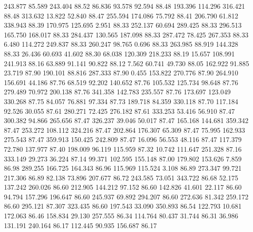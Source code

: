  243.877   85.589  243.404        88.52
  86.836   93.578   92.594        88.48
 193.396  114.296  316.421        88.48
 313.632   13.822   52.840        88.47
 255.594  174.086   75.792        88.41
 206.790   61.812  338.943        88.39
 170.975  125.695    2.951        88.33
 252.137   60.694  289.425        88.33
 296.513  165.750  168.017        88.33
 284.437  130.565  187.098        88.33
 287.472   78.425  267.353        88.33
   6.480  114.272  249.837        88.33
 260.247   98.765    0.696        88.33
 263.985   88.919  144.328        88.33
  26.436   60.693   41.602        88.30
  68.038  120.309  218.233        88.19
  15.657  108.991  241.913        88.16
  63.889   91.141   90.822        88.12
   7.562   60.741   49.730        88.05
 162.922   91.885   23.719        87.90
 190.101   88.816  287.333        87.90
   0.455  153.822  270.776        87.90
 264.910  156.691   44.186        87.76
  68.519   92.202  140.652        87.76
 105.532  125.734   98.648        87.76
 279.489   70.972  200.138        87.76
 341.358  142.783  235.557        87.76
 173.697  123.049  330.268        87.75
  84.057   76.881   97.334        87.73
 189.718   84.359  330.118        87.70
 117.184   92.526   30.055        87.61
 280.271   72.425  276.182        87.61
 333.253   53.416   56.910        87.47
 300.382   94.866  265.656        87.47
 326.237   39.046   50.017        87.47
 165.168  144.681  359.342        87.47
 253.272  108.112  324.216        87.47
 202.864  176.307   65.309        87.47
  75.995  162.933  275.543        87.47
 359.913  150.425  242.809        87.47
  16.096   56.553   48.116        87.47
 117.379   72.780  137.977        87.40
 198.009   96.119  115.959        87.32
  10.742  111.647  251.328        87.16
 333.149   29.273   36.224        87.14
  99.371  102.595  155.148        87.00
 179.802  153.626    7.859        86.98
 289.255  166.725  164.343        86.96
 115.969  115.524    3.108        86.89
 273.347   99.721  217.306        86.89
  82.138   73.896  207.677        86.72
 243.585   73.051  343.722        86.68
  52.175  137.242  260.026        86.60
 212.905  144.212   97.152        86.60
 142.826   41.601   22.117        86.60
  94.794  157.296  196.647        86.60
 245.937   69.892  294.207        86.60
 272.636   81.342  259.172        86.60
 295.121   87.307  323.435        86.60
 197.543   33.090  350.893        86.54
 122.793   10.681  172.063        86.46
 158.834   29.130  257.555        86.34
 114.764   80.437   31.744        86.31
  36.986  131.191  240.164        86.17
 112.445   90.935  156.687        86.17
